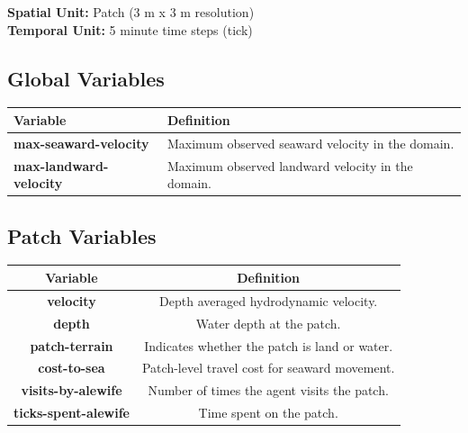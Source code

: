 \documentclass[
]{book}
\begin{document}
\textbf{Spatial Unit:} Patch (3 m x 3 m resolution)\\
\textbf{Temporal Unit:} 5 minute time steps (tick)

\subsection{Global Variables}\label{global-variables-8}

\begin{longtable}[]{@{}
  >{\centering\arraybackslash}p{}
  >{\centering\arraybackslash}p{}@{}}
\toprule\noalign{}
\begin{minipage}[b]{\linewidth}\centering
Variable
\end{minipage} & \begin{minipage}[b]{\linewidth}\centering
Definition
\end{minipage} \\
\midrule\noalign{}
\endhead
\bottomrule\noalign{}
\endlastfoot
\textbf{max-seaward-velocity} & Maximum observed seaward velocity in the domain. \\
\textbf{max-landward-velocity} & Maximum observed landward velocity in the domain. \\
\end{longtable}

\subsection{Patch Variables}\label{patch-variables-8}

\begin{longtable}[]{@{}cc@{}}
\toprule\noalign{}
Variable & Definition \\
\midrule\noalign{}
\endhead
\bottomrule\noalign{}
\endlastfoot
\textbf{velocity} & Depth averaged hydrodynamic velocity. \\
\textbf{depth} & Water depth at the patch. \\
\textbf{patch-terrain} & Indicates whether the patch is land or water. \\
\textbf{cost-to-sea} & Patch-level travel cost for seaward movement. \\
\textbf{visits-by-alewife} & Number of times the agent visits the patch. \\
\textbf{ticks-spent-alewife} & Time spent on the patch. \\
\end{longtable}
\end{document}
